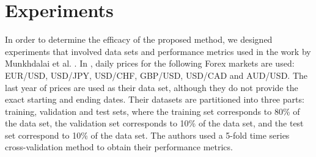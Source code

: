 \documentclass{ieeeaccess}
\begin{document}





\section{Experiments}
\label{section:experiments}

In order to determine the efficacy of the proposed method, we designed
experiments that involved data sets and performance metrics used in
the work by Munkhdalai et al. \cite{Munkhdalai2019}. In
\cite{Munkhdalai2019}, daily prices for the following Forex markets
are used: EUR/USD, USD/JPY, USD/CHF, GBP/USD, USD/CAD and AUD/USD. The last
year of prices are used as their data set, although they do not
provide the exact starting and ending dates. Their datasets are
partitioned into three parts: training, validation and test sets,
where the training set corresponds to 80\% of the data set, the
validation set corresponds to 10\% of the data set, and the test set
correspond to 10\% of the data set. The authors used a 5-fold time
series cross-validation method to obtain their performance metrics.
\end{document}
